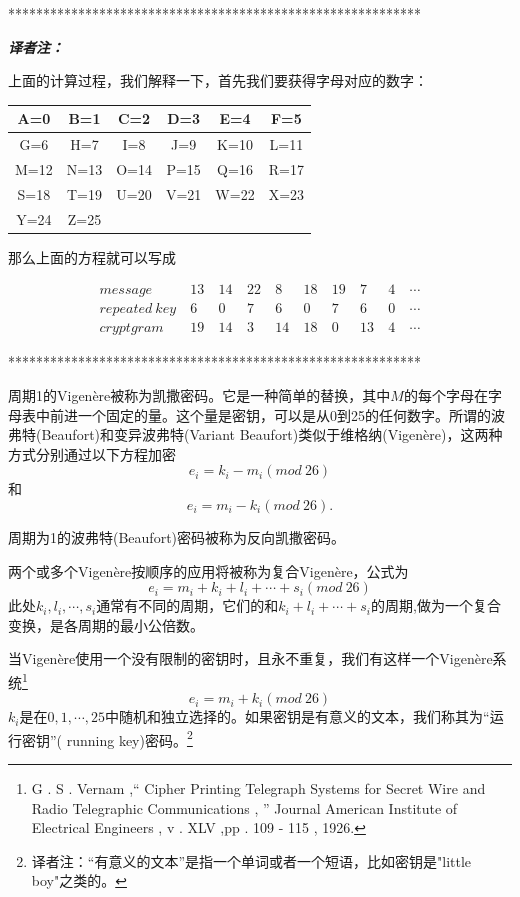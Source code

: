 \documentclass[]{article}
\begin{document}
\vspace{1cm}
***********************************************************\par
\textsl{\textbf{译者注：}}\par
上面的计算过程，我们解释一下，首先我们要获得字母对应的数字：\par
\begin{tabular}{|c|c|c|c|c|c|}
	\hline 
	A=0& B=1 & C=2 & D=3 & E=4 & F=5 \\ 
	\hline 
	G=6& H=7 & I=8 & J=9 & K=10 & L=11 \\ 
	\hline 
	M=12& N=13 & O=14 & P=15 & Q=16 & R=17 \\ 
	\hline 
	S=18& T=19 & U=20 & V=21 & W=22 & X=23 \\ 
	\hline 
	Y=24& Z=25 &  &  &  &  \\ 
	\hline 
\end{tabular} 
\par
那么上面的方程就可以写成\par
\begin{equation}
\begin{aligned}
message\ &13\ &14\    &22\ &8\ &18\ &19\ &7\ &4\ &\cdots\\
repeated\ key\ &6\ &0\ &7\ &6\ &0\ &7\   &6\ &0\ &\cdots\\
cryptgram\ &19\ &14\   &3\ &14\ &18\ &0\ &13\ &4\ &\cdots\nonumber
\end{aligned}
\end{equation}

\par
***********************************************************\par

周期1的Vigen\`{e}re被称为凯撒密码。它是一种简单的替换，其中$M$的每个字母在字母表中前进一个固定的量。这个量是密钥，可以是从0到25的任何数字。所谓的波弗特(Beaufort)和变异波弗特(Variant Beaufort)类似于维格纳(Vigen\`{e}re)，这两种方式分别通过以下方程加密
\[e_i=k_i-m_i(mod\ 26)\]
和
\[e_i=m_i-k_i(mod\ 26).\]

周期为1的波弗特(Beaufort)密码被称为反向凯撒密码。

两个或多个Vigen\`{e}re按顺序的应用将被称为复合Vigen\`{e}re，公式为
\[e_i=m_i+k_i+l_i+\cdots + s_i(mod\ 26)\]
此处$k_i,l_i,\cdots,s_i$通常有不同的周期，它们的和$k_i+l_i+\cdots+s_i$的周期,做为一个复合变换，是各周期的最小公倍数。

当Vigen\`{e}re使用一个没有限制的密钥时，且永不重复，我们有这样一个Vigen\`{e}re系统\footnote{G . S . Vernam ,“ Cipher Printing Telegraph Systems for Secret Wire and Radio Telegraphic Communications , ” Journal American Institute of Electrical Engineers , v . XLV ,pp . 109 - 115 , 1926.}
\[e_i=m_i+k_i(mod\ 26)\]
$k_i$是在$0,1,\cdots,25$中随机和独立选择的。如果密钥是有意义的文本，我们称其为“运行密钥”( running key)密码。\footnote{译者注：“有意义的文本”是指一个单词或者一个短语，比如密钥是"little boy"之类的。}
\end{document}

